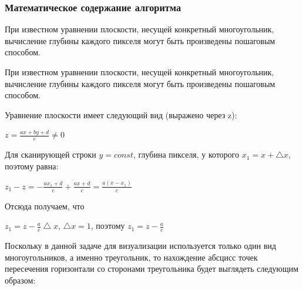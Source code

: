 \documentclass[a4paper,14pt]{extreport}
\begin{document}
\subsubsection{Математическое содержание алгоритма}
При известном уравнении плоскости, несущей конкретный многоугольник,
вычисление глубины каждого пикселя могут быть произведены пошаговым
способом.
\par При известном уравнении плоскости, несущей конкретный многоугольник,
вычисление глубины каждого пикселя могут быть произведены пошаговым
способом.
\par Уравнение плоскости имеет следующий вид (выражено через z):
\begin{center}
	\begin{math}
		z = \frac{
		ax + by + d
  		}{
  		c
		}
 		\neq 0
	\end{math}
\end{center}
\par Для сканирующей строки \begin{math} y = const\end{math}, глубина пикселя, у которого \begin{math} x_1 = x + \bigtriangleup x\end{math}, поэтому равна:
\begin{center}
	\begin{math}
		z_1 - z = - \frac{
		ax_1 +d
  		}{
  		c
		}
 		+  \frac{
		ax +d
  		}{
  		c
		} = 
 		\frac{
		a(x - x_1)
  		}{
  		c
		}
	\end{math}
\end{center}
\par Отсюда получаем, что
\begin{center}
	\begin{math}
		z_1 = z - \frac{
		a
  		}{
  		c
		}\bigtriangleup x
	\end{math}, 
	\begin{math}
		\bigtriangleup x = 1
	\end{math}, поэтому 
	\begin{math}
		z_1 = z - \frac{
		a
  		}{
  		c
		}
	\end{math}
\end{center}
\par Поскольку в данной задаче для визуализации используется только один вид
многоугольников, а именно треугольник, то нахождение абсцисс точек
пересечения горизонтали со сторонами треугольника будет выглядеть
следующим образом:
\end{document}
